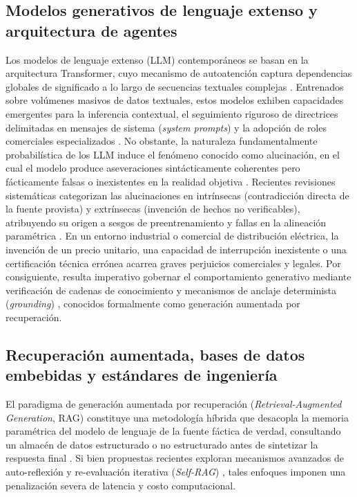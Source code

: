 \subsection{Modelos generativos de lenguaje extenso y arquitectura de agentes}

Los modelos de lenguaje extenso (LLM) contemporáneos se basan en la arquitectura Transformer, cuyo mecanismo de autoatención captura dependencias globales de significado a lo largo de secuencias textuales complejas \parencite{vaswani2017attention}. Entrenados sobre volúmenes masivos de datos textuales, estos modelos exhiben capacidades emergentes para la inferencia contextual, el seguimiento riguroso de directrices delimitadas en mensajes de sistema (\textit{system prompts}) y la adopción de roles comerciales especializados \parencite{wang2024survey}. No obstante, la naturaleza fundamentalmente probabilística de los LLM induce el fenómeno conocido como alucinación, en el cual el modelo produce aseveraciones sintácticamente coherentes pero fácticamente falsas o inexistentes en la realidad objetiva \parencite{ji2023hallucination,huang2023survey}. Recientes revisiones sistemáticas categorizan las alucinaciones en intrínsecas (contradicción directa de la fuente provista) y extrínsecas (invención de hechos no verificables), atribuyendo su origen a sesgos de preentrenamiento y fallas en la alineación paramétrica \parencite{tonmoy2024comprehensive}. En un entorno industrial o comercial de distribución eléctrica, la invención de un precio unitario, una capacidad de interrupción inexistente o una certificación técnica errónea acarrea graves perjuicios comerciales y legales. Por consiguiente, resulta imperativo gobernar el comportamiento generativo mediante verificación de cadenas de conocimiento y mecanismos de anclaje determinista (\textit{grounding}) \parencite{dhuliawala2023chain}, conocidos formalmente como generación aumentada por recuperación.

\subsection{Recuperación aumentada, bases de datos embebidas y estándares de ingeniería}

El paradigma de generación aumentada por recuperación (\textit{Retrieval-Augmented Generation}, RAG) constituye una metodología híbrida que desacopla la memoria paramétrica del modelo de lenguaje de la fuente fáctica de verdad, consultando un almacén de datos estructurado o no estructurado antes de sintetizar la respuesta final \parencite{guu2020realm,lewis2020retrieval,borgeaud2022improving,gao2023retrieval}. Si bien propuestas recientes exploran mecanismos avanzados de auto-reflexión y re-evaluación iterativa (\textit{Self-RAG}) \parencite{asai2024selfrag}, tales enfoques imponen una penalización severa de latencia y costo computacional. 

